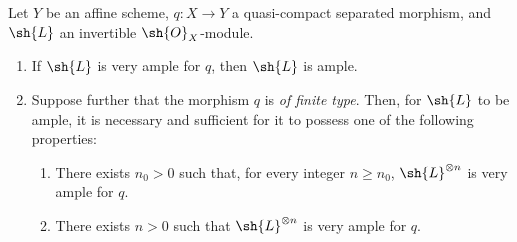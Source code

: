 \begin{proposition}[4.5.10]
\label{II.4.5.10}
Let $Y$ be an affine scheme, $q:X\to Y$ a quasi-compact separated morphism, and $\sh{L}$ an invertible $\sh{O}_X$-module.
\begin{enumerate}
  \item[\rm{(i)}] If $\sh{L}$ is very ample for $q$, then $\sh{L}$ is ample.
  \item[\rm{(ii)}] Suppose further that the morphism $q$ is \emph{of finite type}.
    Then, for $\sh{L}$ to be ample, it is necessary and sufficient for it to possess one of the following properties:
    \begin{enumerate}
      \item[\rm{(e)}] There exists $n_0>0$ such that, for every integer $n\geq n_0$, $\sh{L}^{\otimes n}$ is very ample for $q$.
      \item[\rm{(e')}] There exists $n>0$ such that $\sh{L}^{\otimes n}$ is very ample for $q$.
    \end{enumerate}
\end{enumerate}
\end{proposition}

